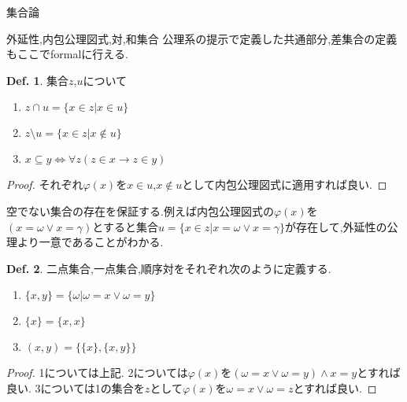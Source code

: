 \documentclass[14pt]{jsarticle}
\theoremstyle{definition}
\newtheorem{dfn}{Def.}[subsection]
\newcommand*{\subtitle}[1]{\hspace{-10pt}{\emph{\large{#1}}}\par\vspace{-0.5pt}}
\begin{document}
\begin{section}{集合論}
\begin{subsection}{外延性,内包公理図式,対,和集合}
公理系の提示で定義した共通部分,差集合の定義もここでformalに行える.
\begin{dfn}
\label{capdef}
集合$z$,$u$について
\begin{enumerate}
	\item $z \cap u = \{x\in z| x\in u\}$
	\item $z \setminus u = \{x \in z | x \not \in u\}$
	\item $x \subseteq y \Leftrightarrow \forall z( z \in x \to z \in y)$
\end{enumerate}
\end{dfn}
\begin{proof}
それぞれ$\varphi(x)$を$x\in u$,$x\not \in u$として内包公理図式に適用すれば良い.
\end{proof}

\subtitle{対の公理:$\exists z(x \in z \land y \in z)$}
空でない集合の存在を保証する.例えば内包公理図式の$\varphi(x)$を$(x=\omega \lor x=\gamma)$とすると集合$u=\{x\in z| x = \omega \lor x = \gamma\}$が存在して,外延性の公理より一意であることがわかる.

\begin{dfn}二点集合,一点集合,順序対をそれぞれ次のように定義する.
\label{tuppledef}
\begin{enumerate}
	\item $\{x,y\}=\{\omega|\omega = x \lor \omega = y\}$
	\item $\{x\}=\{x,x\}$
	\item $(x,y)=\{\{x\},\{x,y\}\}$
\end{enumerate}
\end{dfn}
\begin{proof}
1については上記.
2については$\varphi(x)$を$(\omega = x \lor \omega =y)\land x=y$とすれば良い.
3については1の集合を$z$として$\varphi(x)$を$\omega = x \lor \omega = z$とすれば良い. 
\end{proof}


\end{subsection}
\end{section}
\end{document}
